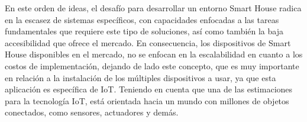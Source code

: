 En este orden de ideas, el desafío para desarrollar un entorno Smart House radica en la escasez de sistemas específicos, con capacidades enfocadas a las tareas fundamentales que requiere este tipo de soluciones, así como también la baja accesibilidad que ofrece el mercado. En consecuencia, los dispositivos de Smart House disponibles en el mercado, no se enfocan en la escalabilidad en cuanto a los costos de implementación, dejando de lado este concepto, que es muy importante en relación a la instalación de los múltiples dispositivos a usar, ya que esta aplicación es específica de IoT. Teniendo en cuenta que una de las estimaciones para la tecnología IoT, está orientada hacia un mundo con millones de objetos conectados, como sensores, actuadores y demás.\\
